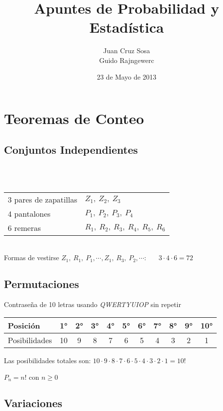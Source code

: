 \documentclass[a4paper,10pt]{article}
\title{ Apuntes de Probabilidad y Estadística }
\author{Juan Cruz Sosa \\ Guido Rajngewerc}
\date{23 de Mayo de 2013}
\begin{document}
\maketitle
\tableofcontents 
\clearpage
\section{Teoremas de Conteo}
\subsection{Conjuntos Independientes}


\ejemplo \\ \\
\begin{tabular}{ l  l }
   3 pares de zapatillas & $Z_1,\ Z_2,\ Z_3$
   \\ 4 pantalones & $P_1,\ P_2,\ P_3,\ P_4$
   \\ 6 remeras & $R_1,\ R_2,\ R_3,\ R_4,\ R_5,\ R_6$
 \end{tabular} \\

Formas de vestirse $Z_1,\ R_1,\ P_1,\cdots,Z_1,\ R_3,\ P_2,\cdots$: \ \ \  $3 \cdot 4 \cdot 6 = 72$


\subsection{Permutaciones}

\ejemplo Contraseña de 10 letras usando \textit{QWERTYUIOP} sin repetir \\ 

\begin{center}
  \begin{tabular}[t]{ | l | c | c | c | c | c | c | c | c | c | c | }
    \hline
    Posición & 1° & 2° & 3° & 4° & 5° & 6° & 7° & 8° & 9° & 10° \\
    \hline Posibilidades & 10 & 9 & 8 & 7 & 6 & 5 & 4 & 3 & 2 & 1 \\
    \hline
  \end{tabular}
\end{center}

Las posibilidades totales son: $10 \cdot 9 \cdot 8 \cdot 7 \cdot 6 \cdot 5 \cdot 4 \cdot 3 \cdot 2 \cdot 1 = 10!$ \\ \\

$P_n = n! \mbox{ con } n \geq 0$


\subsection{Variaciones}
\end{document}
